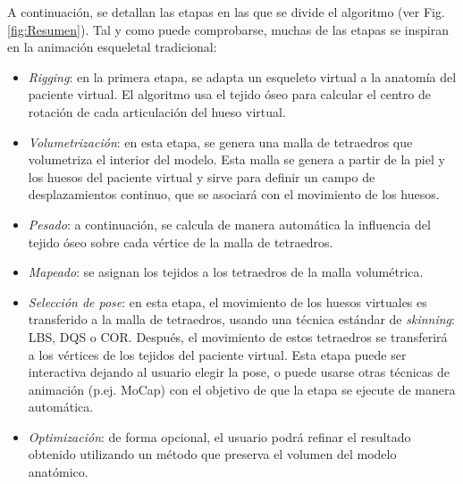 A continuación, se detallan las etapas en las que se divide el algoritmo (ver Fig. \ref{fig:Resumen}). Tal y como puede comprobarse, muchas de las etapas se inspiran en la animación esqueletal tradicional:
\begin{itemize}

	\item \emph{Rigging}: %
	en la primera etapa, se adapta un esqueleto virtual a la anatomía del paciente virtual. El algoritmo usa el tejido óseo para calcular el centro de rotación de cada articulación del hueso virtual.
	
     \item \emph{Volumetrización}: en esta etapa, se genera una malla de tetraedros que volumetriza el interior del modelo. Esta malla se genera a partir de la piel y los huesos del paciente virtual y sirve para definir un campo de desplazamientos continuo, que se asociará con el movimiento de los huesos.

    \item \emph{Pesado}: a continuación, se calcula de manera automática la influencia del tejido óseo sobre cada vértice de la malla de tetraedros. 
    
    \item \emph{Mapeado}: se asignan los tejidos a los tetraedros de la malla volumétrica. 

    \item \emph{Selección de pose}: en esta etapa, el movimiento de los huesos virtuales es transferido a la malla de tetraedros, usando una técnica estándar de \emph{skinning}: \ac{LBS}, \ac{DQS} o \ac{COR}. 
    Después, el movimiento de estos tetraedros se transferirá a los vértices de los tejidos del paciente virtual.
    Esta etapa puede ser interactiva dejando al usuario elegir la pose, o puede usarse otras técnicas de animación (p.ej. \ac{MoCap}) con el objetivo de que la etapa se ejecute de manera automática.%
    \item \emph{Optimización}: de forma opcional, el usuario podrá refinar el resultado obtenido utilizando un método que preserva el volumen del modelo anatómico.
\end{itemize}

